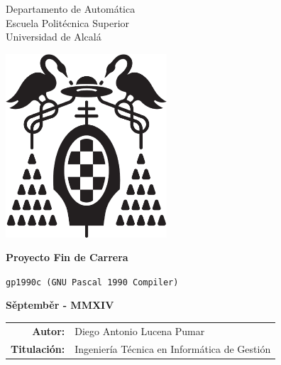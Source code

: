 \thispagestyle{empty}
\vspace{5cm}
\begin{center}

{\LARGE
Departamento de Automática\\
Escuela Politécnica Superior\\
Universidad de Alcalá\\
}

\vspace{2cm}


\includegraphics[width=6cm]{pictures/logo-uah.eps}

\vspace{1cm}

{\LARGE \textbf{Proyecto Fin de Carrera}}

\vspace{1cm}

{\LARGE \texttt{gp1990c (GNU Pascal 1990 Compiler)}}

\vspace{2cm}

\textbf{S\v{e}ptemb\v{e}r - MMXIV}

\begin{table}[h]
\centering
\begin{tabular}{r l}
\textbf{Autor:} & Diego Antonio Lucena Pumar \\
\textbf{Titulación:} & Ingeniería Técnica en Informática de Gestión
\end{tabular}
\end{table}

\end{center}